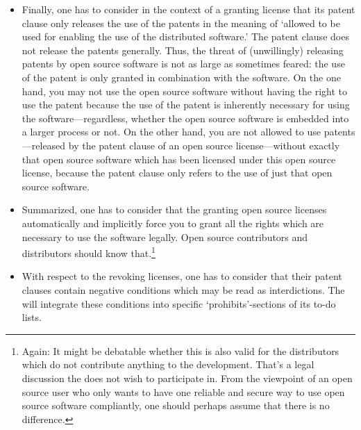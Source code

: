 \begin{itemize}
  \item Finally, one has to consider in the context of a granting license that
  its patent clause only releases the use of the patents in the meaning of
  `allowed to be used for enabling the use of the distributed software.' The
  patent clause does not release the patents generally. Thus, the threat of
  (unwillingly) releasing patents by open source software is not as large as
  sometimes feared: the use of the patent is only granted in combination with
  the software. On the one hand, you may not use the open source software
  without having the right to use the patent because the use of the patent is
  inherently necessary for using the software---regardless, whether the open
  source software is embedded into a larger process or not. On the other hand,
  you are not allowed to use patents---released by the patent clause of an open
  source license---without exactly that open source software which has been
  licensed under this open source license, because the patent clause only refers
  to the use of just that open source software.

  \item Summarized, one has to consider that the granting open source licenses
  automatically and implicitly force you to grant all the rights which are
  necessary to use the software legally. Open source contributors and
  distributors should know that.\footnote{Again: It might be debatable whether
  this is also valid for the distributors which do not contribute anything to
  the development. That's a legal discussion the \oslic{} does not wish to participate
  in. From the viewpoint of an open source user who only wants to have one
  reliable and secure way to use open source software compliantly, one should
  perhaps assume that there is no difference.}

  \item With respect to the revoking licenses, one has to consider that their
  patent clauses contain negative conditions which may be read as interdictions.
  The \oslic{} will integrate these conditions into specific `prohibits'-sections
  of its to-do lists.
  

\end{itemize}
